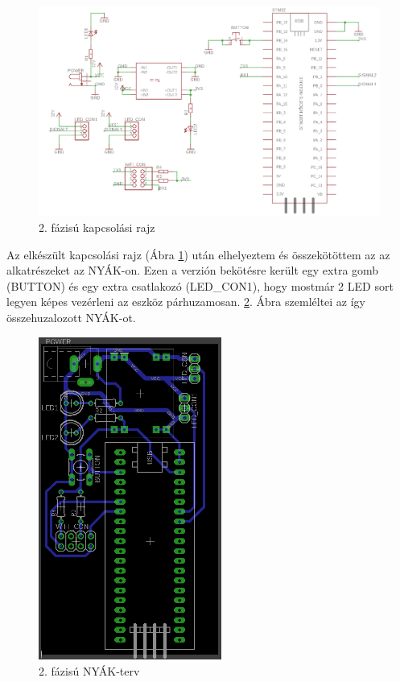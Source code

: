 \documentclass[../main.tex]{subfiles}
\begin{document}
        \begin{figure}[h!]
            \centering
                \includegraphics[width=15cm]{resources/pcb_res/schematic_v01.png}
            \caption{2. fázisú kapcsolási rajz}
            \label{fig:schematic_v01}
        \end{figure}
        
        Az elkészült kapcsolási rajz (Ábra \ref{fig:schematic_v01}) után elhelyeztem és összekötöttem az az alkatrészeket az NYÁK-on. Ezen a verzión bekötésre került egy extra gomb (BUTTON) és egy extra csatlakozó (LED\_CON1), hogy mostmár 2 LED sort legyen képes vezérleni az eszköz párhuzamosan. \ref{fig:board_v01}. Ábra szemléltei az így összehuzalozott NYÁK-ot.
        
        \begin{figure}[h!]
            \centering
                \includegraphics[width=6cm]{resources/pcb_res/board_v01.png}
            \caption{2. fázisú NYÁK-terv}
            \label{fig:board_v01}
        \end{figure}
        
\end{document}
